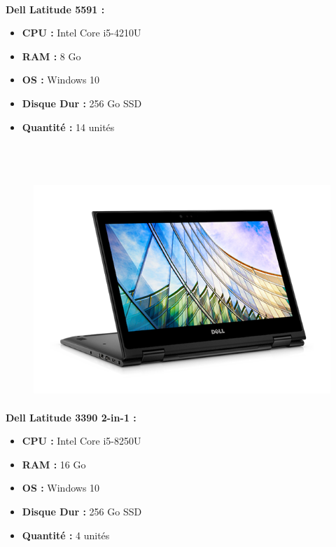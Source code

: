 \documentclass[11pt,a4paper,oneside]{article}
\begin{document}
\paragraph{}\textbf{Dell Latitude 5591 :} \\
\begin{itemize}
\item \textbf{CPU :} Intel Core i5-4210U
\item \textbf{RAM :} 8 Go
\item \textbf{OS :} Windows 10
\item \textbf{Disque Dur :} 256 Go SSD
\item \textbf{Quantité :} 14 unités
\\ \\ \\ \\
\end{itemize}
\begin{figure}
\includegraphics[scale=0.35]{Ressources/Materiel/3390.png}\vspace{-2cm}
\end{figure}
\paragraph{}\textbf{Dell Latitude 3390 2-in-1 :} \\
\begin{itemize}
\item \textbf{CPU :} Intel Core i5-8250U
\item \textbf{RAM :} 16 Go
\item \textbf{OS :} Windows 10
\item \textbf{Disque Dur :} 256 Go SSD
\item \textbf{Quantité :} 4 unités
\\ \\ \\ \\
\end{itemize}
\end{document}
